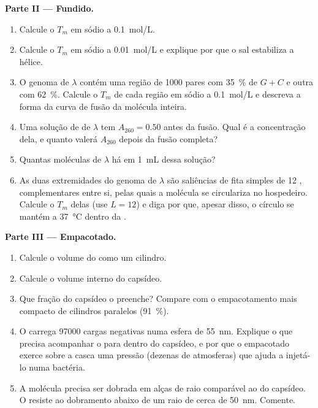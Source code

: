 \begin{problem}
\medskip
\noindent\textbf{Parte II --- Fundido.}
\begin{enumerate}[resume]
  \item Calcule o $T_m$ em sódio a \qty{0.1}{mol/L}.
  \item Calcule o $T_m$ em sódio a \qty{0.01}{mol/L} e explique por que
        o sal estabiliza a hélice.
  \item O genoma de $\lambda$ contém uma região de \qty{1000}{} pares
        com \qty{35}{\%} de $G + C$ e outra com \qty{62}{\%}. Calcule o
        $T_m$ de cada região em sódio a \qty{0.1}{mol/L} e descreva a
        forma da curva de fusão da molécula inteira.
  \item Uma solução de  de $\lambda$ tem $A_{260} = 0.50$ antes da
        fusão. Qual é a concentração dela, e quanto valerá $A_{260}$
        depois da fusão completa?
  \item Quantas moléculas de $\lambda$ há em \qty{1}{mL} dessa solução?
  \item As duas extremidades do genoma de $\lambda$ são saliências de
        fita simples de 12 , complementares entre si, pelas
        quais a molécula se circulariza no hospedeiro. Calcule o $T_m$
        delas (use $L = 12$) e diga por que, apesar disso, o círculo se
        mantém a \qty{37}{\celsius} dentro da .
\end{enumerate}

\medskip
\noindent\textbf{Parte III --- Empacotado.}
\begin{enumerate}[resume]
  \item Calcule o volume do  como um cilindro.
  \item Calcule o volume interno do capsídeo.
  \item Que fração do capsídeo o  preenche? Compare com o
        empacotamento mais compacto de cilindros paralelos
        (\qty{91}{\%}).
  \item O  carrega \num{97000} cargas negativas numa esfera de
        \qty{55}{nm}. Explique o que precisa acompanhar o  para
        dentro do capsídeo, e por que o  empacotado exerce sobre a
        casca uma pressão (dezenas de atmosferas) que ajuda a injetá-lo
        numa bactéria.
  \item A molécula precisa ser dobrada em alças de raio comparável ao do
        capsídeo. O  resiste ao dobramento abaixo de um raio de cerca
        de \qty{50}{nm}. Comente.
\end{enumerate}


\end{problem}
